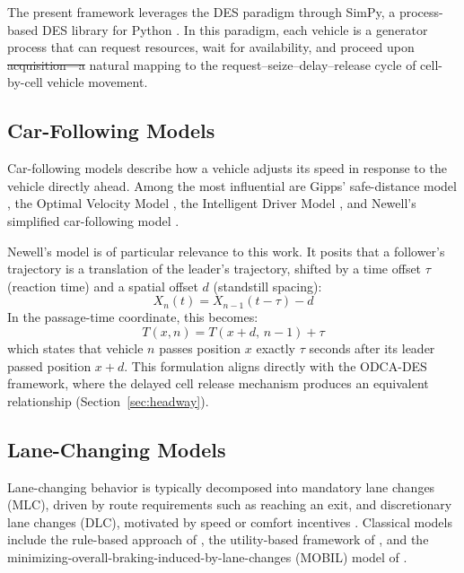 \documentclass[review,authoryear]{elsarticle}
\providecommand{\DIFaddtex}[1]{{\protect\color{blue}\uwave{#1}}} %
\providecommand{\DIFdeltex}[1]{{\protect\color{red}\sout{#1}}}                      %
\providecommand{\DIFaddbegin}{} %
\providecommand{\DIFaddend}{} %
\providecommand{\DIFdelbegin}{} %
\providecommand{\DIFdelend}{} %
\providecommand{\DIFadd}[1]{\texorpdfstring{\DIFaddtex{#1}}{#1}} %
\providecommand{\DIFdel}[1]{\texorpdfstring{\DIFdeltex{#1}}{}} %
\newcommand{\DIFscaledelfig}{0.5}
\newlength{\DIFdelgraphicswidth} %
\newlength{\DIFdelgraphicsheight} %
\newcommand{\DIFaddincludegraphics}[2][]{{\color{blue}\fbox{\DIFOincludegraphics[#1]{#2}}}} %
\newcommand{\DIFdelincludegraphics}[2][]{%
\sbox{\DIFdelgraphicsbox}{\DIFOincludegraphics[#1]{#2}}%
\settoboxwidth{\DIFdelgraphicswidth}{\DIFdelgraphicsbox} %
\settoboxtotalheight{\DIFdelgraphicsheight}{\DIFdelgraphicsbox} %
\scalebox{\DIFscaledelfig}{%
\parbox[b]{\DIFdelgraphicswidth}{\usebox{\DIFdelgraphicsbox}\\[-\baselineskip] \rule{\DIFdelgraphicswidth}{0em}}\llap{\resizebox{\DIFdelgraphicswidth}{\DIFdelgraphicsheight}{%
\setlength{\unitlength}{\DIFdelgraphicswidth}%
\begin{picture}(1,1)%
\thicklines\linethickness{2pt} %
{\color[rgb]{1,0,0}\put(0,0){\framebox(1,1){}}}%
{\color[rgb]{1,0,0}\put(0,0){\line( 1,1){1}}}%
{\color[rgb]{1,0,0}\put(0,1){\line(1,-1){1}}}%
\end{picture}%
}\hspace*{3pt}}} %
} %
\DeclareRobustCommand{\DIFaddbegin}{\DIFOaddbegin \let\includegraphics\DIFaddincludegraphics} %
\DeclareRobustCommand{\DIFaddend}{\DIFOaddend \let\includegraphics\DIFOincludegraphics} %
\DeclareRobustCommand{\DIFdelbegin}{\DIFOdelbegin \let\includegraphics\DIFdelincludegraphics} %
\DeclareRobustCommand{\DIFdelend}{\DIFOaddend \let\includegraphics\DIFOincludegraphics} %
\begin{document}
The present framework leverages the DES paradigm through SimPy, a process-based DES library for Python \citep{simpy2023}. In this paradigm, each vehicle is a generator process that can request resources, wait for availability, and proceed upon \DIFdelbegin \DIFdel{acquisition---a }\DIFdelend \DIFaddbegin \DIFadd{acquisition, a }\DIFaddend natural mapping to the request--seize--delay--release cycle of cell-by-cell vehicle movement.

\subsection{Car-Following Models}
\label{sec:lit_cf}

Car-following models describe how a vehicle adjusts its speed in response to the vehicle directly ahead. Among the most influential are Gipps' safe-distance model \citep{gipps1981behavioural}, the Optimal Velocity Model \citep{bando1995dynamical}, the Intelligent Driver Model \citep{treiber2000congested}, and Newell's simplified car-following model \citep{newell2002simplified}.

Newell's model is of particular relevance to this work. It posits that a follower's trajectory is a translation of the leader's trajectory, shifted by a time offset $\tau$ (reaction time) and a spatial offset $d$ (standstill spacing):
\begin{equation}
    X_{n}(t) = X_{n-1}(t - \tau) - d
    \label{eq:newell_cf}
\end{equation}
In the passage-time coordinate, this becomes:
\begin{equation}
    T(x, n) = T(x + d,\, n-1) + \tau
    \label{eq:newell_cf_Txn}
\end{equation}
which states that vehicle $n$ passes position $x$ exactly $\tau$ seconds after its leader passed position $x + d$. This formulation aligns directly with the ODCA-DES framework, where the delayed cell release mechanism produces an equivalent relationship (Section~\ref{sec:headway}).

\subsection{Lane-Changing Models}
\label{sec:lit_lc}

Lane-changing behavior is typically decomposed into mandatory lane changes (MLC), driven by route requirements such as reaching an exit, and discretionary lane changes (DLC), motivated by speed or comfort incentives \citep{zheng2014recent}. Classical models include the rule-based approach of \citet{gipps1986model}, the utility-based framework of \citet{toledo2003modeling}, and the minimizing-overall-braking-induced-by-lane-changes (MOBIL) model of \citet{kesting2007general}.
\end{document}
